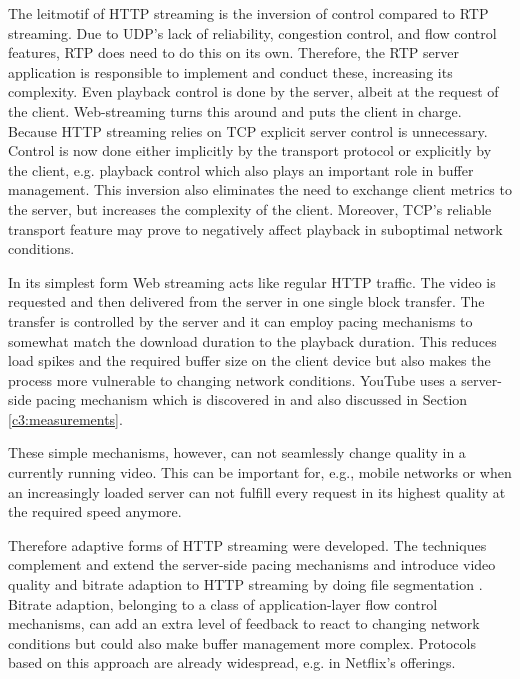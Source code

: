 The leitmotif of \gls{HTTP} streaming is the inversion of control compared to \gls{RTP} streaming. Due to \gls{UDP}'s lack of reliability, congestion control, and flow control features, \gls{RTP} does need to do this on its own. Therefore, the \gls{RTP} server application is responsible to implement and conduct these, increasing its complexity. Even playback control is done by the server, albeit at the request of the client. Web-streaming turns this around and puts the client in charge. Because \gls{HTTP} streaming relies on \gls{TCP} explicit server control is unnecessary. Control is now done either implicitly by the transport protocol or explicitly by the client, e.g. playback control which also plays an important role in buffer management. This inversion also eliminates the need to exchange client metrics to the server, but increases the complexity of the client. Moreover, \gls{TCP}'s reliable transport feature may prove to negatively affect playback in suboptimal network conditions.



In its simplest form Web streaming acts like regular \gls{HTTP} traffic. The video is requested and then delivered from the server in one single block transfer. The transfer is controlled by the server and it can employ pacing mechanisms to somewhat match the download duration to the playback duration. This reduces load spikes and the required buffer size on the client device but also makes the process more vulnerable to changing network conditions. YouTube uses a server-side pacing mechanism which is  discovered in \cite{alcock2011afcyt} and also discussed in Section \ref{c3:measurements}.

These simple mechanisms, however, can not seamlessly change quality in a currently running video. This can be important for, e.g., mobile networks or when an increasingly loaded server can not fulfill every request in its highest quality at the required speed anymore.

Therefore adaptive forms of \gls{HTTP} streaming were developed. The techniques complement and extend the server-side pacing mechanisms and introduce video quality and bitrate adaption to \gls{HTTP} streaming by doing file segmentation \cite{ma2011mobile, watching-video1}. Bitrate adaption, belonging to a class of application-layer flow control mechanisms, can add an extra level of feedback to react to changing network conditions but could also make buffer management more complex. Protocols based on this approach are already widespread, e.g. in Netflix's offerings.



